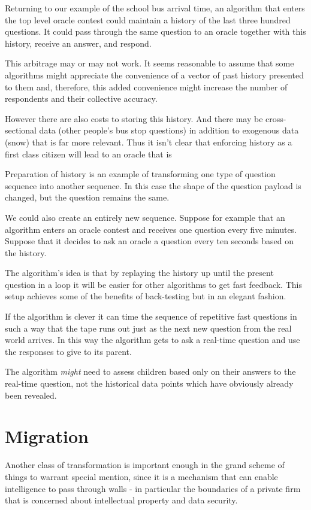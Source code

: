 Returning to our example of the school bus arrival time, an algorithm that enters the top level oracle contest could maintain a history of the last three hundred questions. It could pass through the same question to an oracle together with this history, receive an answer, and respond. 

This arbitrage may or may not work. It seems reasonable to assume that some algorithms might appreciate the convenience of a vector of past history presented to them and, therefore, this added convenience might increase the number of respondents and their collective accuracy. 

However there are also costs to storing this history. And there may be cross-sectional data (other people's bus stop questions) in addition to exogenous data (snow) that is far more relevant. Thus it isn't clear that enforcing history as a first class citizen will lead to an oracle that is

Preparation of history is an example of transforming one type of question sequence into another sequence. In this case the shape of the question payload is changed, but the question remains the same. 

We could also create an entirely new sequence. Suppose for example that an algorithm enters an oracle contest and receives one question every five minutes. Suppose that it decides to ask an oracle a question every ten seconds based on the history. 

The algorithm's idea is that by replaying the history up until the present question in a loop it will be easier for other algorithms to get fast feedback. This setup achieves some of the benefits of back-testing but in an elegant fashion. 

If the algorithm is clever it can time the sequence of repetitive fast questions in such a way that the tape runs out just as the next new question from the real world arrives. In this way the algorithm gets to ask a real-time question and use the responses to give to its parent. 

The algorithm {\em might} need to assess children based only on their answers to the real-time question, not the historical data points which have obviously already been revealed. 

\section{Migration}
\label{sec:migration}

Another class of transformation is important enough in the grand scheme of things to warrant special mention, since it is a mechanism that can enable intelligence to pass through walls - in particular the boundaries of a private firm that is concerned about intellectual property and data security. 

